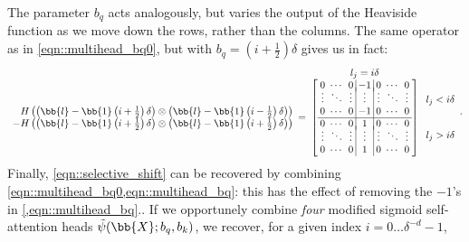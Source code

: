 {The parameter $b_q$ acts analogously, but varies the output of the Heaviside function as we move down the rows, rather than the columns. The same operator as in \cref{eqn::multihead_bq0}, but with $b_q=\left(i+\frac{1}{2}\right)\delta$ gives us in fact:
\begin{equation}
    \arraycolsep=2.5pt
    \begin{array}{ccc}
    &l_j=i\delta&\\%
    \begin{array}{r}
        H\left(\left(\bb{l}-\bb{1}\left(i+\frac{1}{2}\right)\delta\right)\otimes\left(\bb{l}-\bb{1}\left(i-\frac{1}{2}\right)\delta\right)\right)\\
        -H\left(\left(\bb{l}-\bb{1}\left(i+\frac{1}{2}\right)\delta\right)\otimes\left(\bb{l}-\bb{1}\left(i+\frac{1}{2}\right)\delta\right)\right) \\
    \end{array}=&
    \left[\begin{array}{ccc|c|ccc}
    0      & \cdots & 0      & -1     & 0      & \cdots & 0     \\[-1ex]
    \vdots & \ddots & \vdots & \vdots & \vdots & \ddots & \vdots\\
    0      & \cdots & 0      & -1     & 0      & \cdots & 0     \\\hline
    0      & \cdots & 0      & 1      & 0      & \cdots & 0     \\[-1ex]
    \vdots & \ddots & \vdots & \vdots & \vdots & \ddots & \vdots\\
    0      & \cdots & 0      & 1      & 0      & \cdots & 0     \\
    \end{array}\right]&
    \begin{array}{c}
    l_j<i\delta\\
    \\
    \\
    l_j>i\delta\\
    \end{array}
    \end{array}.
    \label{eqn::multihead_bq}
\end{equation}
Finally, \cref{eqn::selective_shift} can be recovered by combining \cref{eqn::multihead_bq0,eqn::multihead_bq}: this has the effect of removing the $-1$'s in \cref{,eqn::multihead_bq}.}.
If we opportunely combine \emph{four} modified sigmoid self-attention heads $\tilde{\psi}(\bb{X};b_q,b_k)$, we recover, for a given index $i=0\dots\delta^{-d}-1$,
